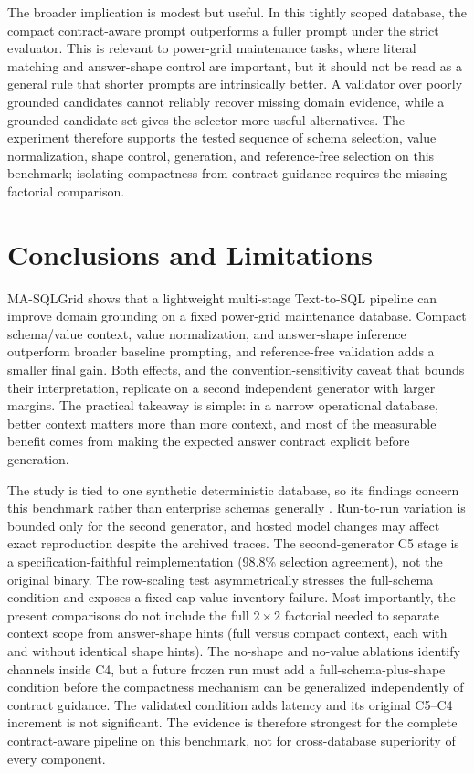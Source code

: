\documentclass{article}
\begin{document}
The broader implication is modest but useful. In this tightly scoped database, the compact contract-aware prompt outperforms a fuller prompt under the strict evaluator. This is relevant to power-grid maintenance tasks, where literal matching and answer-shape control are important, but it should not be read as a general rule that shorter prompts are intrinsically better. A validator over poorly grounded candidates cannot reliably recover missing domain evidence, while a grounded candidate set gives the selector more useful alternatives. The experiment therefore supports the tested sequence of schema selection, value normalization, shape control, generation, and reference-free selection on this benchmark; isolating compactness from contract guidance requires the missing factorial comparison.

\section{Conclusions and Limitations}\label{conclusion}

MA-SQLGrid shows that a lightweight multi-stage Text-to-SQL pipeline can improve domain grounding on a fixed power-grid maintenance database. Compact schema/value context, value normalization, and answer-shape inference outperform broader baseline prompting, and reference-free validation adds a smaller final gain. Both effects, and the convention-sensitivity caveat that bounds their interpretation, replicate on a second independent generator with larger margins. The practical takeaway is simple: in a narrow operational database, better context matters more than more context, and most of the measurable benefit comes from making the expected answer contract explicit before generation.

The study is tied to one synthetic deterministic database, so its findings concern this benchmark rather than enterprise schemas generally \cite{zhong2020semantic,lei2024spider}. Run-to-run variation is bounded only for the second generator, and hosted model changes may affect exact reproduction despite the archived traces. The second-generator C5 stage is a specification-faithful reimplementation (98.8\% selection agreement), not the original binary. The row-scaling test asymmetrically stresses the full-schema condition and exposes a fixed-cap value-inventory failure. Most importantly, the present comparisons do not include the full $2\times2$ factorial needed to separate context scope from answer-shape hints (full versus compact context, each with and without identical shape hints). The no-shape and no-value ablations identify channels inside C4, but a future frozen run must add a full-schema-plus-shape condition before the compactness mechanism can be generalized independently of contract guidance. The validated condition adds latency and its original C5--C4 increment is not significant. The evidence is therefore strongest for the complete contract-aware pipeline on this benchmark, not for cross-database superiority of every component.
\end{document}
